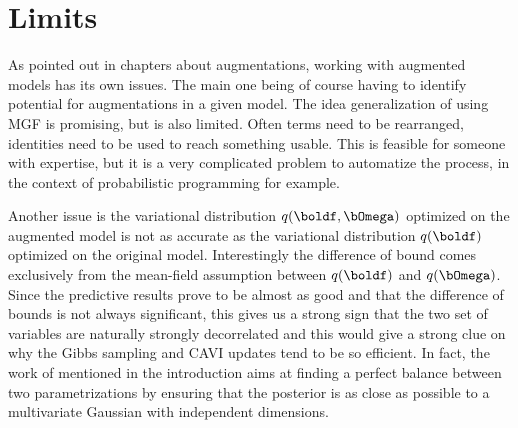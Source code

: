 \section{Limits}

As pointed out in chapters about augmentations, working with augmented models has its own issues.
The main one being of course having to identify potential for augmentations in a given model.
The idea generalization of using \ac{MGF} is promising, but is also limited.
Often terms need to be rearranged, identities need to be used to reach something usable.
This is feasible for someone with expertise, but it is a very complicated problem to automatize the process, in the context of probabilistic programming for example.

Another issue is the variational distribution $q(\boldf, \bOmega)$ optimized on the augmented model is not as accurate as the variational distribution $q(\boldf)$ optimized on the original model.
Interestingly the difference of bound comes exclusively from the mean-field assumption between $q(\boldf)$ and $q(\bOmega)$.
Since the predictive results prove to be almost as good and that the difference of bounds is not always significant, this gives us a strong sign that the two set of variables are naturally strongly decorrelated and this would give a strong clue on why the Gibbs sampling and \ac{CAVI} updates tend to be so efficient.
In fact, the work of \citet{gorinovaAutomaticReparameterisationProbabilistic2020} mentioned in the introduction aims at finding a perfect balance between two parametrizations by ensuring that the posterior is as close as possible to a multivariate Gaussian with independent dimensions.




